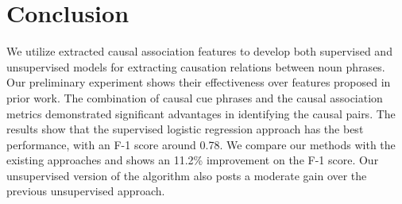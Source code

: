 \section{Conclusion}

We utilize extracted causal association features to develop
both supervised and unsupervised models for extracting causation relations
between noun phrases. Our preliminary experiment shows their effectiveness
over features proposed in prior work. The combination of causal cue phrases
and the causal association metrics demonstrated significant advantages
in identifying the causal pairs. The results show that the supervised
logistic regression approach has the best performance, with an F-1 score
around 0.78. We compare our methods with the existing approaches
\cite{chang2006incremental,girju2003automatic} and shows an 11.2\% improvement
on the F-1 score. Our unsupervised version of the algorithm also
posts a moderate gain over the previous unsupervised approach.

